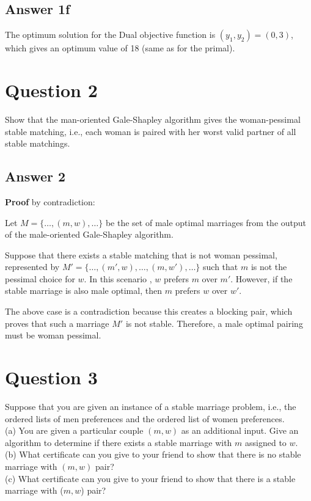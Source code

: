 \documentclass[twoside]{article}
\begin{document}
\subsection{Answer 1f}

The optimum solution for the Dual objective function is $(y_{1}, y_{2}) = (0, 3)$, which gives an optimum value of 18 (same as for the primal).

\section{Question 2}
Show that the man-oriented Gale-Shapley algorithm gives the woman-pessimal stable matching, i.e., each woman is paired with her worst valid partner of all stable matchings. 

\subsection{Answer 2}

\textbf{Proof} by contradiction:

Let $M = \{ \ldots, (m, w), \ldots \}$ be the set of male optimal marriages from the output of the male-oriented Gale-Shapley algorithm. 

Suppose that there exists a stable matching that is not woman pessimal, represented by $M' = \{ \ldots, (m', w), \ldots, (m, w'), \ldots\}$ such that $m$ is not the pessimal choice for $w$. In this scenario , $w$ prefers $m$ over $m'$. However, if the stable marriage is also male optimal, then $m$ prefers $w$ over $w'$. 

The above case is a contradiction because this creates a blocking pair, which proves that such a marriage $M'$ is not stable. Therefore, a male optimal pairing must be woman pessimal.

\section{Question 3}
Suppose that you are given an instance of a stable marriage problem, i.e., the ordered lists of men preferences and the ordered list of women preferences.\\

(a) You are given a particular couple $(m, w)$ as an additional input. Give an algorithm to determine if there exists a stable marriage with $m$ assigned to $w$.\\
(b) What certificate can you give to your friend to show that there is no stable marriage with $(m, w)$ pair?\\
(c) What certificate can you give to your friend to show that there is a stable marriage with ($m, w$) pair?
\end{document}
